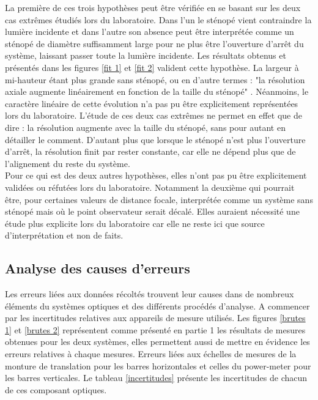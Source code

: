 \documentclass[11pt,letterpaper]{article}
\begin{document}
La première de ces trois hypothèses peut être vérifiée en se basant sur les deux cas extrêmes étudiés lors du laboratoire. Dans l'un le sténopé vient contraindre la lumière incidente et dans l'autre son absence peut être interprétée comme un sténopé de diamètre suffisamment large pour ne plus être l'ouverture d'arrêt du système, laissant passer toute la lumière incidente. Les résultats obtenus et présentés dans les figures \ref{fit 1} et \ref{fit 2} valident cette hypothèse. La largeur à mi-hauteur étant plus grande sans sténopé, ou en d'autre termes : "la résolution axiale augmente linéairement en fonction de la taille du sténopé" . Néanmoins, le caractère linéaire de cette évolution n'a pas pu être explicitement représentées lors du laboratoire. L'étude de ces deux cas extrêmes ne permet en effet que de dire : la résolution augmente avec la taille du sténopé, sans pour autant en détailler le comment. D'autant plus que lorsque le sténopé n'est plus l'ouverture d'arrêt, la résolution finit par rester constante, car elle ne dépend plus que de l'alignement du reste du système. \\ 

Pour ce qui est des deux autres hypothèses, elles n'ont pas pu être explicitement validées ou réfutées lors du laboratoire. Notamment la deuxième qui pourrait être, pour certaines valeurs de distance focale, interprétée comme un système sans sténopé mais où le point observateur serait décalé. Elles auraient nécessité une étude plus explicite lors du laboratoire car elle ne reste ici que source d'interprétation et non de faits. 

\subsection{Analyse des causes d'erreurs}

Les erreurs liées aux données récoltés trouvent leur causes dans de nombreux éléments du systèmes optiques et des différents procédés d'analyse. A commencer par les incertitudes relatives aux appareils de mesure utilisés. Les figures \ref{brutes 1} et \ref{brutes 2} représentent comme présenté en partie 1 les résultats de mesures obtenues pour les deux systèmes, elles permettent aussi de mettre en évidence les erreurs relatives à chaque mesures. Erreurs liées aux échelles de mesures de la monture de translation pour les barres horizontales et celles du power-meter pour les barres verticales. Le tableau \ref{incertitudes} présente les incertitudes de chacun de ces composant optiques. 
\end{document}
